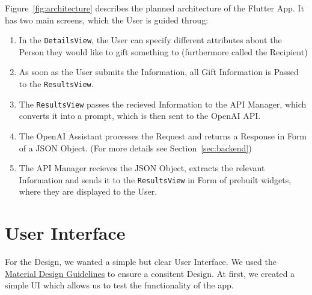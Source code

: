 Figure~\ref{fig:architecture} describes the planned architecture of the Flutter App. It has two main screens, which the User is guided throug:
\begin{enumerate}
	\item In the \texttt{DetailsView}, the User can specify different attributes about the Person they would like to gift something to (furthermore called the Recipient)

	\item As soon as the User submits the Information, all Gift Information is Passed to the \texttt{ResultsView}.

	\item The \texttt{ResultsView} passes the recieved Information to the API Manager, which converts it into a prompt, which is then sent to the OpenAI API.

	\item The OpenAI Assistant processes the Request and returns a Response in Form of a JSON Object. (For more details see Section~\ref{sec:backend})

	\item The API Manager recieves the JSON Object, extracts the relevant Information and sends it to the \texttt{ResultsView} in Form of prebuilt widgets, where they are displayed to the User.
\end{enumerate}

\section*{User Interface}

For the Design, we wanted a simple but clear User Interface. We used the  \href{https://m3.material.io/}{Material Design Guidelines} to ensure a consitent Design. At first, we created a simple UI which allows us to test the functionality of the app.

